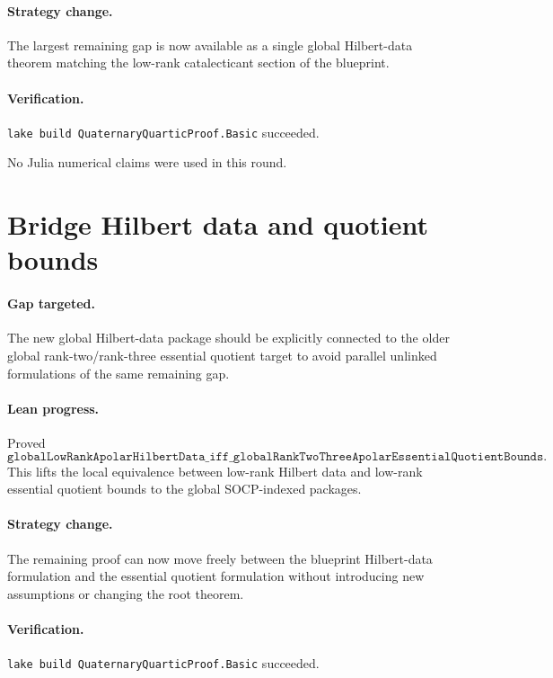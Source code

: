 \documentclass[11pt]{article}
\begin{document}
\paragraph{Strategy change.}
The largest remaining gap is now available as a single global Hilbert-data
theorem matching the low-rank catalecticant section of the blueprint.

\paragraph{Verification.}
\texttt{lake build QuaternaryQuarticProof.Basic} succeeded.

No Julia numerical claims were used in this round.

\section*{Bridge Hilbert data and quotient bounds}

\paragraph{Gap targeted.}
The new global Hilbert-data package should be explicitly connected to the
older global rank-two/rank-three essential quotient target to avoid parallel
unlinked formulations of the same remaining gap.

\paragraph{Lean progress.}
Proved
\[
\texttt{globalLowRankApolarHilbertData\_iff\_globalRankTwoThreeApolarEssentialQuotientBounds}.
\]
This lifts the local equivalence between low-rank Hilbert data and low-rank
essential quotient bounds to the global SOCP-indexed packages.

\paragraph{Strategy change.}
The remaining proof can now move freely between the blueprint Hilbert-data
formulation and the essential quotient formulation without introducing new
assumptions or changing the root theorem.

\paragraph{Verification.}
\texttt{lake build QuaternaryQuarticProof.Basic} succeeded.
\end{document}
